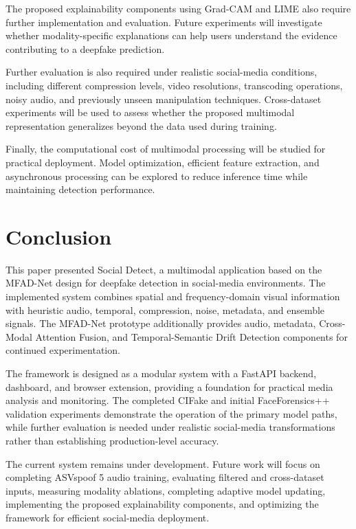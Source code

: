 \documentclass[conference]{IEEEtran}
\begin{document}
The proposed explainability components using Grad-CAM and LIME also require further implementation and evaluation. Future experiments will investigate whether modality-specific explanations can help users understand the evidence contributing to a deepfake prediction.

Further evaluation is also required under realistic social-media conditions, including different compression levels, video resolutions, transcoding operations, noisy audio, and previously unseen manipulation techniques. Cross-dataset experiments will be used to assess whether the proposed multimodal representation generalizes beyond the data used during training.

Finally, the computational cost of multimodal processing will be studied for practical deployment. Model optimization, efficient feature extraction, and asynchronous processing can be explored to reduce inference time while maintaining detection performance.

\section{Conclusion}

This paper presented Social Detect, a multimodal application based on the MFAD-Net design for deepfake detection in social-media environments. The implemented system combines spatial and frequency-domain visual information with heuristic audio, temporal, compression, noise, metadata, and ensemble signals. The MFAD-Net prototype additionally provides audio, metadata, Cross-Modal Attention Fusion, and Temporal-Semantic Drift Detection components for continued experimentation.

The framework is designed as a modular system with a FastAPI backend, dashboard, and browser extension, providing a foundation for practical media analysis and monitoring. The completed CIFake and initial FaceForensics++ validation experiments demonstrate the operation of the primary model paths, while further evaluation is needed under realistic social-media transformations rather than establishing production-level accuracy.

The current system remains under development. Future work will focus on completing ASVspoof 5 audio training, evaluating filtered and cross-dataset inputs, measuring modality ablations, completing adaptive model updating, implementing the proposed explainability components, and optimizing the framework for efficient social-media deployment.
\end{document}
